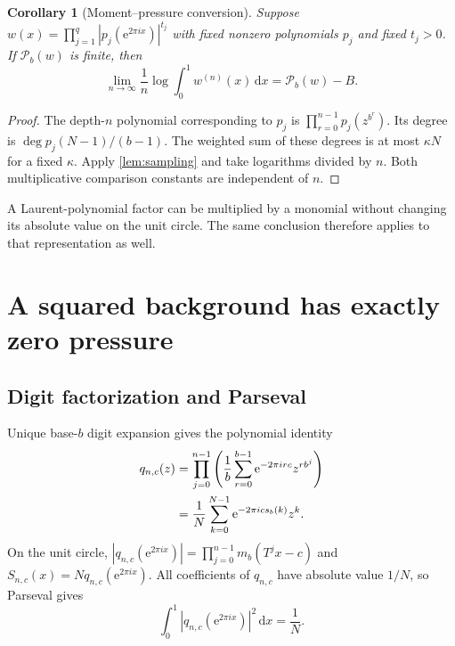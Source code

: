 \documentclass[11pt,a4paper]{article}
\numberwithin{equation}{section}
\newtheorem{corollary}[corollary]{Corollary}\aliascntresetthe{corollary}
\theoremstyle{definition}
\theoremstyle{remark}
\newcommand{\dd}{\,\mathrm d}
\newcommand{\ee}{\mathrm e}
\newcommand{\PP}{\mathcal P}
\begin{document}
\begin{corollary}[Moment--pressure conversion]
\label{cor:conversion}
Suppose
$w(x)=\prod_{j=1}^q|p_j(\ee^{2\pi ix})|^{t_j}$ with fixed nonzero
polynomials $p_j$ and fixed $t_j>0$. If $\PP_b(w)$ is finite, then
\begin{equation}
 \lim_{n\to\infty}\frac1n\log\int_0^1w^{(n)}(x)\dd x
       =\PP_b(w)-B.
 \label{eq:conversion}
\end{equation}
\end{corollary}
\begin{proof}
The depth-$n$ polynomial corresponding to $p_j$ is
$\prod_{r=0}^{n-1}p_j(z^{b^r})$. Its degree is
$\deg p_j(N-1)/(b-1)$. The weighted sum of these degrees is at most
$\kappa N$ for a fixed $\kappa$. Apply \cref{lem:sampling} and take
logarithms divided by $n$. Both multiplicative comparison constants
are independent of $n$.
\end{proof}
A Laurent-polynomial factor can be multiplied by a monomial without
changing its absolute value on the unit circle. The same conclusion
therefore applies to that representation as well.

\section{A squared background has exactly zero pressure}
\label{sec:mixed-proof}
\subsection{Digit factorization and Parseval}
Unique base-$b$ digit expansion gives the polynomial identity
\begin{align}
 q_{n,c}(z)
 &=\prod_{j=0}^{n-1}\left(\frac1b\sum_{r=0}^{b-1}
                    \ee^{-2\pi irc}z^{rb^j}\right)\notag\\
 &=\frac1N\sum_{k=0}^{N-1}\ee^{-2\pi ic s_b(k)}z^k.
 \label{eq:digit-factorization}
\end{align}
On the unit circle,
$|q_{n,c}(\ee^{2\pi ix})|=\prod_{j=0}^{n-1}m_b(T^jx-c)$ and
$S_{n,c}(x)=Nq_{n,c}(\ee^{2\pi ix})$. All coefficients of $q_{n,c}$
have absolute value $1/N$, so Parseval gives
\begin{equation}
 \int_0^1|q_{n,c}(\ee^{2\pi ix})|^2\dd x=\frac1N.
 \label{eq:parseval-background}
\end{equation}
\end{document}
